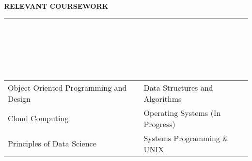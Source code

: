 \documentclass[10pt]{book}
\begin{document}
{\begin{spacing}{0.2}
{                \selectfont\textbf{RELEVANT COURSEWORK}
                \\
            }
            \rule{\linewidth}{0.4pt}
            \\
            \\
            \\
            \\
            \\
        \end{spacing}
        \noindent
        \begin{tabular}{p{} p{}}
            Object-Oriented Programming and Design & Data Structures and Algorithms \\
            Cloud Computing & Operating Systems (In Progress) \\
            Principles of Data Science & Systems Programming \& UNIX \\
        \end{tabular}
        \fi
    }
\end{document}
